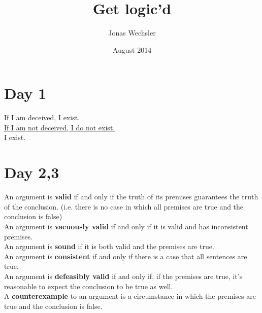 \documentclass{article}
\title{Get logic'd}
\author{Jonas Wechsler}
\date{August 2014}
\begin{document}
\maketitle

\section{Day 1}
If I am deceived, I exist.
\\ \underline{If I am not deceived, I do not exist.}
\\ I exist.
\section{Day 2,3}
An argument is \textbf{valid} if and only if the truth of its premises guarantees the truth of the conclusion. (i.e. there is no case in which all premises are true and the conclusion is false)
\\An argument is \textbf{vacuously valid} if and only if it is valid and has inconsistent premises.
\\An argument is \textbf{sound} if it is both valid and the premises are true.
\\An argument is \textbf{consistent} if and only if there is a case that all sentences are true.
\\An argument is \textbf{defeasibly valid} if and only if, if the premises are true, it's reasonable to expect the conclusion to be true as well.
\\A \textbf{counterexample} to an argument is a circumstance in which the premises are true and the conclusion is false.
\end{document}
